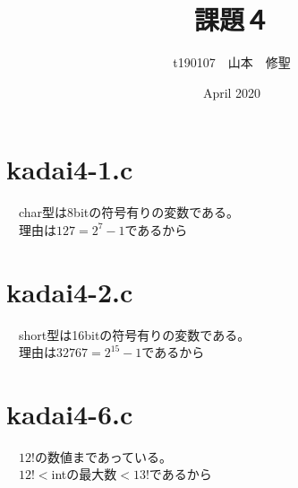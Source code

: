 \documentclass{article}
\title{課題４}
\author{t190107　山本　修聖 }
\date{April 2020}
\begin{document}
\maketitle
\section{kadai4-1.c}
　char型は8bitの符号有りの変数である。\\
　理由は$127=2^{7}-1$であるから
\section{kadai4-2.c}
　short型は16bitの符号有りの変数である。\\
　理由は$32767=2^{15}-1$であるから
\section{kadai4-6.c}
　$12!$の数値まであっている。\\
　$12!<$intの最大数$<13!$であるから
\end{document}
